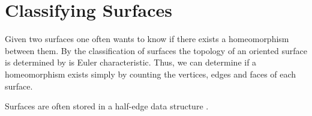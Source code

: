 \section{Classifying Surfaces}
\label{sec:classiify}


Given two surfaces one often wants to know
if there exists a homeomorphism between them.
By the classification of surfaces the topology of
an oriented surface is determined by is Euler characteristic.
Thus, we can determine if a homeomorphism exists simply by
counting the vertices, edges and faces of each surface.

Surfaces are often stored in a half-edge data structure \cite{Crane:2013}.
